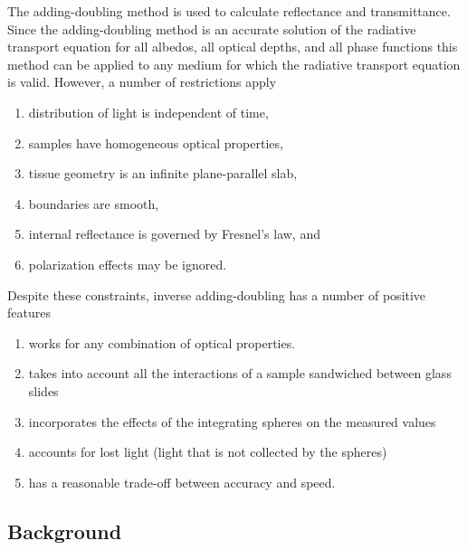 \documentclass{article}
\begin{document}
The adding-doubling method is used to calculate reflectance and transmittance.
Since the adding-doubling method is an accurate solution of the radiative
transport equation for all albedos, all optical depths, and all phase functions
this method can be applied to any medium for which the radiative transport
equation is valid.  However, a number of restrictions apply
\begin{enumerate}
\item
distribution of light is independent of time,
\item
samples have homogeneous optical properties,
\item
tissue geometry is an infinite plane-parallel slab,
\item
boundaries are smooth,
\item
internal reflectance is governed by Fresnel's law, and
\item
polarization effects may be ignored.
\end{enumerate}
Despite these constraints, inverse adding-doubling has a number of positive features
\begin{enumerate}
\item
works for any combination of optical properties.
\item
takes into account all the interactions of a sample sandwiched
between glass slides
\item
incorporates the effects of the integrating spheres on the
measured values
\item
accounts for lost light (light that is not collected by the spheres)
\item
has a reasonable trade-off between accuracy and speed.
\end{enumerate}

\subsection{Background}
\end{document}
